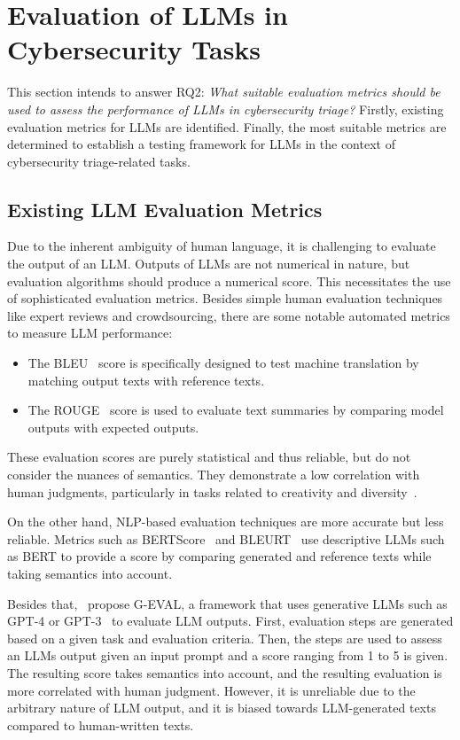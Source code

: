 \section{Evaluation of LLMs in Cybersecurity Tasks}
\label{sec:rq2}

This section intends to answer RQ2:
\textit{What suitable evaluation metrics should be used to assess the performance of LLMs in cybersecurity triage?}
Firstly, existing evaluation metrics for LLMs are identified.
Finally, the most suitable metrics are determined to establish a testing framework for LLMs in the context of
cybersecurity triage-related tasks.

\subsection{Existing LLM Evaluation Metrics}
\label{subsec:rq2-existing-metrics}

Due to the inherent ambiguity of human language, it is challenging to evaluate the output of an LLM\@.
Outputs of LLMs are not numerical in nature, but evaluation algorithms should produce a numerical score.
This necessitates the use of sophisticated evaluation metrics.
Besides simple human evaluation techniques like expert reviews and crowdsourcing, there are some notable automated
metrics to measure LLM performance:
\begin{itemize}
    \item The BLEU\ \citep{papineni2002bleu} score is specifically designed to test machine translation by matching
    output texts with reference texts.
    \item The ROUGE\ \citep{lin2004rouge} score is used to evaluate text summaries by comparing model outputs with
    expected outputs.
\end{itemize}
These evaluation scores are purely statistical and thus reliable, but do not consider the nuances of semantics.
They demonstrate a low correlation with human judgments, particularly in tasks related to creativity and
diversity\ \citep{liu2023gpteval}.

On the other hand, NLP-based evaluation techniques are more accurate but less reliable.
Metrics such as BERTScore\ \citep{zhang2019bertscore} and BLEURT\ \citep{sellam2020bleurt} use descriptive LLMs such as
BERT to provide a score by comparing generated and reference texts while taking semantics into account.

Besides that,\ \citet{liu2023gpteval} propose G-EVAL, a framework that uses generative LLMs such as GPT-4 or
GPT-3\ \citep{brown2020language} to evaluate LLM outputs.
First, evaluation steps are generated based on a given task and evaluation criteria.
Then, the steps are used to assess an LLMs output given an input prompt and a score ranging from 1 to 5 is given.
The resulting score takes semantics into account, and the resulting evaluation is more correlated with human judgment.
However, it is unreliable due to the arbitrary nature of LLM output, and it is biased towards LLM-generated texts
compared to human-written texts.

